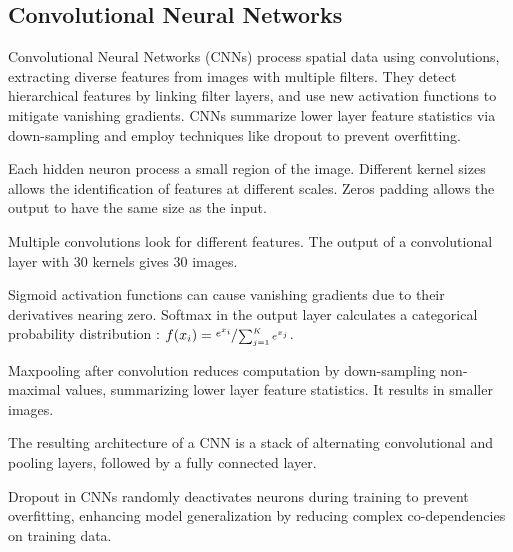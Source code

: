 \subsection*{Convolutional Neural Networks}
Convolutional Neural Networks (CNNs) process spatial data using
convolutions, extracting diverse features from images with multiple
filters. They detect hierarchical features by linking filter layers,
and use new activation functions to mitigate vanishing gradients.
CNNs summarize lower layer feature statistics via down-sampling and
employ techniques like dropout to prevent overfitting.

Each hidden neuron process a small region of the image. Different kernel sizes
allows the identification of features at different scales. Zeros padding allows
the output to have the same size as the input.

Multiple convolutions look for different features. The output of a convolutional
layer with 30 kernels gives 30 images.

Sigmoid activation functions can cause vanishing gradients due to their derivatives
nearing zero. Softmax in the output layer calculates a categorical
probability distribution : $f(x_i)=\sfrac{e^{x_i}}{\sum_{j=1}^{K}e^{x_j}}$.

Maxpooling after convolution reduces computation by down-sampling non-maximal
values, summarizing lower layer feature statistics. It results in smaller images.

The resulting architecture of a CNN is a stack of alternating convolutional and
pooling layers, followed by a fully connected layer.

Dropout in CNNs randomly deactivates neurons during training to prevent
overfitting, enhancing model generalization by reducing complex
co-dependencies on training data.